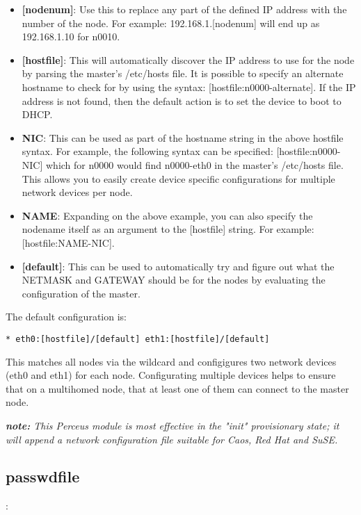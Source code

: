 \documentclass[10pt,letterpaper]{report}
\begin{document}
\begin{itemize}

\item {\bf [nodenum]}: Use this to replace any part of the defined IP address
with the number of the node. For example: 192.168.1.[nodenum] will end up as
192.168.1.10 for n0010.

\item {\bf [hostfile]}: This will automatically discover the IP address to use
for the node by parsing the master's /etc/hosts file. It is possible to
specify an alternate hostname to check for by using the syntax:
[hostfile:n0000-alternate].  If the IP address is not found, then the default
action is to set the device to boot to DHCP.

\item {\bf NIC}: This can be used as part of the hostname string in the above
hostfile syntax. For example, the following syntax can be specified:
[hostfile:n0000-NIC] which for n0000 would find n0000-eth0 in the master's
/etc/hosts file. This allows you to easily create device specific
configurations for multiple network devices per node.

\item {\bf NAME}: Expanding on the above example, you can also specify the
nodename itself as an argument to the [hostfile] string. For example:
[hostfile:NAME-NIC].

\item {\bf [default]}: This can be used to automatically try and figure out
what the NETMASK and GATEWAY should be for the nodes by evaluating the
configuration of the master.

\end{itemize}


The default configuration is:

\begin{verbatim}
* eth0:[hostfile]/[default] eth1:[hostfile]/[default]
\end{verbatim}

This matches all nodes via the wildcard {\tt *} and configigures two
network devices (eth0 and eth1) for each node. Configurating multiple devices
helps to ensure that on a multihomed node, that at least one of them can
connect to the master node.

{\it {\bf note:} This Perceus module is most effective in the "init"
provisionary state; it will append a network configuration file suitable for
Caos, Red Hat and SuSE.}


\subsection{passwdfile}:
\end{document}
